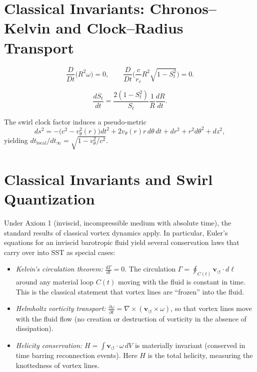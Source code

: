 \documentclass[10pt,reprint,aps,onecolumn,nofootinbib]{revtex4-2}
\newcommand{\vswirl}{\mathbf{v}_{\!\boldsymbol{\circlearrowleft}}}
\begin{document}
    \section{Classical Invariants: Chronos--Kelvin and Clock--Radius Transport}\label{canon58:classical-invariants}
    \begin{tcolorbox}[title=Axiom: Chronos--Kelvin Invariant]
    \label{canon58:CK}
    \[
        \frac{D}{Dt}\big(R^2\omega\big)=0,
        \qquad
        \frac{D}{Dt}\Big(\frac{c}{r_c}R^2\sqrt{1-S_t^2}\Big)=0.
    \]
    \end{tcolorbox}
    \begin{tcolorbox}[title=Corollary: Clock--Radius Transport]
    \label{canon58:clock-transport}
    \[
        \frac{dS_t}{dt} = \frac{2(1-S_t^2)}{S_t}\frac{1}{R}\frac{dR}{dt}.
    \]
    \end{tcolorbox}
    \begin{tcolorbox}[title=Remark (Pseudo-metric)]
    The swirl clock factor induces a pseudo-metric
    \[
        ds^2 = -\big(c^2 - v_\theta^2(r)\big)dt^2 + 2v_\theta(r)r\,d\theta\,dt + dr^2 + r^2 d\theta^2 + dz^2,
    \]
    yielding $dt_{\text{local}}/dt_\infty = \sqrt{1 - v_\theta^2/c^2}$. %
    \end{tcolorbox}


    \section{Classical Invariants and Swirl Quantization}
	Under Axiom 1 (inviscid, incompressible medium with absolute time), the standard results of classical vortex dynamics apply. In particular, Euler’s equations for an inviscid barotropic fluid yield several conservation laws that carry over into SST as special cases:

	\begin{itemize}
	    \item \emph{Kelvin’s circulation theorem:} $\displaystyle \frac{d\Gamma}{dt} = 0$. The circulation $\Gamma = \oint_{C(t)} \vswirl \cdot d\ell$ around any material loop $C(t)$ moving with the fluid is constant in time. This is the classical statement that vortex lines are “frozen” into the fluid.
	    \item \emph{Helmholtz vorticity transport:} $\displaystyle \frac{\partial \omega}{\partial t} = \nabla \times (\vswirl \times \omega)$, so that vortex lines move with the fluid flow (no creation or destruction of vorticity in the absence of dissipation).
	    \item \emph{Helicity conservation:} $H = \int \vswirl \cdot \omega\, dV$ is materially invariant (conserved in time barring reconnection events). Here $H$ is the total helicity, measuring the knottedness of vortex lines.
	\end{itemize}
\end{document}
